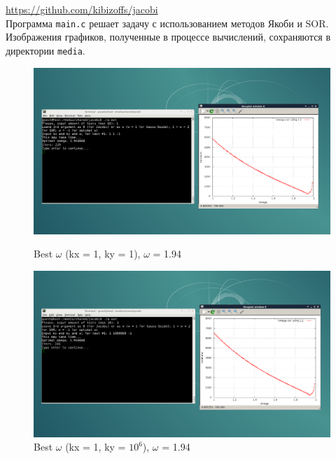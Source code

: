 \documentclass[a4paper, fleqn]{report}
\begin{document}
\href{https://github.com/kibizoffs/jacobi}{https://github.com/kibizoffs/jacobi} \\

Программа \texttt{main.c} решает задачу с использованием методов Якоби и SOR. \\
Изображения графиков, полученные в процессе вычислений, сохраняются в директории \texttt{media}. \\

\begin{figure}[h]
    \centering
    \begin{minipage}{0.49\textwidth}
        \centering
        \includegraphics[width=\textwidth]{media/best_w_1_1.png}
        \caption{Best \(\omega\) (kx = 1, ky = 1), \(\omega\) = 1.94}
    \end{minipage}%
    \begin{minipage}{0.49\textwidth}
        \centering
        \includegraphics[width=\textwidth]{media/best_w_1_1000000.png}
        \caption{Best \(\omega\) (kx = 1, ky = $10^6$), \(\omega\) = 1.94}
    \end{minipage}
    \begin{minipage}{0.49\textwidth}

\end{minipage}
\end{figure}
\end{document}
